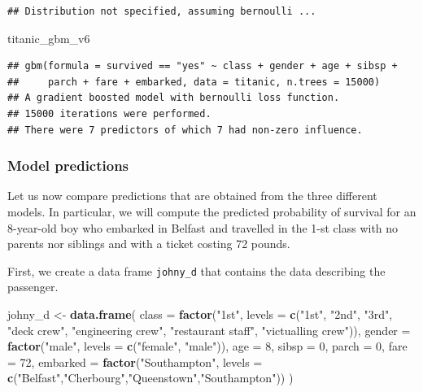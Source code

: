 \documentclass[12pt,]{krantz}
\newenvironment{Shaded}{\begin{snugshade}}{\end{snugshade}}
\newcommand{\DataTypeTok}[1]{\textcolor[rgb]{0.13,0.29,0.53}{#1}}
\newcommand{\DecValTok}[1]{\textcolor[rgb]{0.00,0.00,0.81}{#1}}
\newcommand{\KeywordTok}[1]{\textcolor[rgb]{0.13,0.29,0.53}{\textbf{#1}}}
\newcommand{\NormalTok}[1]{#1}
\newcommand{\StringTok}[1]{\textcolor[rgb]{0.31,0.60,0.02}{#1}}
\begin{document}
\begin{verbatim}
## Distribution not specified, assuming bernoulli ...
\end{verbatim}

\begin{Shaded}
\begin{Highlighting}[]
\NormalTok{titanic_gbm_v6}
\end{Highlighting}
\end{Shaded}

\begin{verbatim}
## gbm(formula = survived == "yes" ~ class + gender + age + sibsp + 
##     parch + fare + embarked, data = titanic, n.trees = 15000)
## A gradient boosted model with bernoulli loss function.
## 15000 iterations were performed.
## There were 7 predictors of which 7 had non-zero influence.
\end{verbatim}

\hypertarget{predictions-titanic}{%
\subsubsection{Model predictions}\label{predictions-titanic}}

Let us now compare predictions that are obtained from the three different models. In particular, we will compute the predicted probability of survival for an 8-year-old boy who embarked in Belfast and travelled in the 1-st class with no parents nor siblings and with a ticket costing 72 pounds.

First, we create a data frame \texttt{johny\_d} that contains the data describing the passenger.

\begin{Shaded}
\begin{Highlighting}[]
\NormalTok{johny_d <-}\StringTok{ }\KeywordTok{data.frame}\NormalTok{(}
            \DataTypeTok{class =} \KeywordTok{factor}\NormalTok{(}\StringTok{"1st"}\NormalTok{, }\DataTypeTok{levels =} \KeywordTok{c}\NormalTok{(}\StringTok{"1st"}\NormalTok{, }\StringTok{"2nd"}\NormalTok{, }\StringTok{"3rd"}\NormalTok{, }\StringTok{"deck crew"}\NormalTok{, }\StringTok{"engineering crew"}\NormalTok{, }\StringTok{"restaurant staff"}\NormalTok{, }\StringTok{"victualling crew"}\NormalTok{)),}
            \DataTypeTok{gender =} \KeywordTok{factor}\NormalTok{(}\StringTok{"male"}\NormalTok{, }\DataTypeTok{levels =} \KeywordTok{c}\NormalTok{(}\StringTok{"female"}\NormalTok{, }\StringTok{"male"}\NormalTok{)),}
            \DataTypeTok{age =} \DecValTok{8}\NormalTok{,}
            \DataTypeTok{sibsp =} \DecValTok{0}\NormalTok{,}
            \DataTypeTok{parch =} \DecValTok{0}\NormalTok{,}
            \DataTypeTok{fare =} \DecValTok{72}\NormalTok{,}
            \DataTypeTok{embarked =} \KeywordTok{factor}\NormalTok{(}\StringTok{"Southampton"}\NormalTok{, }\DataTypeTok{levels =} \KeywordTok{c}\NormalTok{(}\StringTok{"Belfast"}\NormalTok{,}\StringTok{"Cherbourg"}\NormalTok{,}\StringTok{"Queenstown"}\NormalTok{,}\StringTok{"Southampton"}\NormalTok{))}
\NormalTok{)}
\end{Highlighting}
\end{Shaded}
\end{document}
